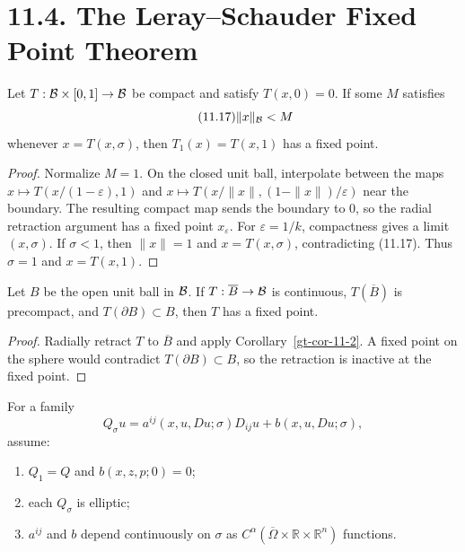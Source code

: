 \section*{11.4. The Leray--Schauder Fixed Point Theorem}

\begin{theorem}
\label{gt-thm-11-6}
Let $T:\mathcal{B}\times[0,1]\to\mathcal{B}$ be compact and satisfy $T(x,0)=0$. If some
$M$ satisfies
\begin{equation}
\tag{11.17}
\|x\|_{\mathcal{B}}<M
\end{equation}
whenever $x=T(x,\sigma)$, then $T_1(x)=T(x,1)$ has a fixed point.
\end{theorem}
\begin{proof}
\sketch Normalize $M=1$. On the closed unit ball, interpolate between the
maps $x\mapsto T(x/(1-\varepsilon),1)$ and
$x\mapsto T(x/\|x\|,(1-\|x\|)/\varepsilon)$ near the boundary. The resulting
compact map sends the boundary to $0$, so the radial retraction argument has
a fixed point $x_\varepsilon$. For $\varepsilon=1/k$, compactness gives a
limit $(x,\sigma)$. If $\sigma<1$, then $\|x\|=1$ and
$x=T(x,\sigma)$, contradicting (11.17). Thus $\sigma=1$ and $x=T(x,1)$.
\end{proof}

\begin{lemma}
\label{gt-lem-11-7}
Let $B$ be the open unit ball in $\mathcal{B}$. If
$T:\overline B\to\mathcal{B}$ is continuous, $T(\overline B)$ is precompact, and
$T(\partial B)\subset B$, then $T$ has a fixed point.
\end{lemma}
\begin{proof}
\sketch Radially retract $T$ to $\overline B$ and apply
Corollary~\ref{gt-cor-11-2}. A fixed point on the sphere would contradict
$T(\partial B)\subset B$, so the retraction is inactive at the fixed point.
\end{proof}

For a family
\[
Q_\sigma u=a^{ij}(x,u,Du;\sigma)D_{ij}u+b(x,u,Du;\sigma),
\]
assume:
\begin{enumerate}
\item $Q_1=Q$ and $b(x,z,p;0)=0$;
\item each $Q_\sigma$ is elliptic;
\item $a^{ij}$ and $b$ depend continuously on $\sigma$ as
$C^\alpha(\overline\Omega\times\mathbb R\times\mathbb R^n)$ functions.
\end{enumerate}

